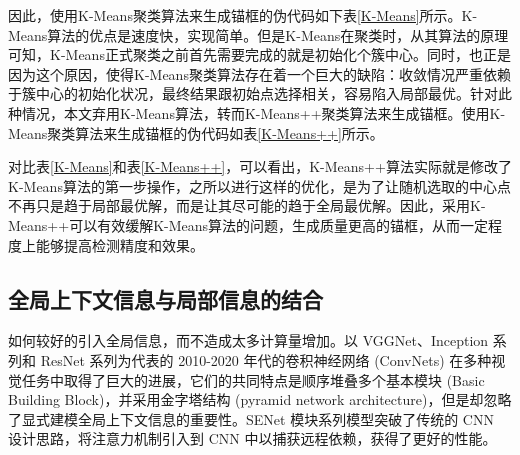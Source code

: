 因此，使用K-Means聚类算法来生成锚框的伪代码如下表\ref{K-Means}所示。K-Means算法的优点是速度快，实现简单。但是K-Means在聚类时，从其算法的原理可知，K-Means正式聚类之前首先需要完成的就是初始化个簇中心。同时，也正是因为这个原因，使得K-Means聚类算法存在着一个巨大的缺陷：收敛情况严重依赖于簇中心的初始化状况，最终结果跟初始点选择相关，容易陷入局部最优。针对此种情况，本文弃用K-Means算法，转而K-Means++聚类算法来生成锚框。使用K-Means聚类算法来生成锚框的伪代码如表\ref{K-Means++}所示。
\begin{table}[htbp]
	\centering
	\caption{K-Means聚类算法生成锚框伪代码}
	\label{K-Means}%
\end{table}%
\begin{table}[htbp]
	\centering
	\caption{K-Means++聚类算法生成锚框伪代码}
	\label{K-Means++}%
\end{table}%

对比表\ref{K-Means}和表\ref{K-Means++}，可以看出，K-Means++算法实际就是修改了K-Means算法的第一步操作，之所以进行这样的优化，是为了让随机选取的中心点不再只是趋于局部最优解，而是让其尽可能的趋于全局最优解。因此，采用K-Means++可以有效缓解K-Means算法的问题，生成质量更高的锚框，从而一定程度上能够提高检测精度和效果。

\subsection{全局上下文信息与局部信息的结合}
如何较好的引入全局信息，而不造成太多计算量增加。以 VGGNet、Inception 系列和 ResNet 系列为代表的 2010-2020 年代的卷积神经网络 (ConvNets) 在多种视觉任务中取得了巨大的进展，它们的共同特点是顺序堆叠多个基本模块 (Basic Building Block)，并采用金字塔结构 (pyramid network architecture)，但是却忽略了显式建模全局上下文信息的重要性。SENet 模块系列模型突破了传统的 CNN 设计思路，将注意力机制引入到 CNN 中以捕获远程依赖，获得了更好的性能。

